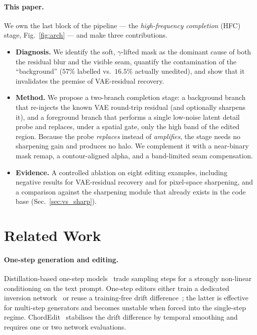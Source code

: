 \documentclass[10pt,twocolumn,letterpaper]{article}
\begin{document}
\paragraph{This paper.}
We own the last block of the pipeline --- the \emph{high-frequency completion}
(HFC) stage, Fig.~\ref{fig:arch} --- and make three contributions.
\begin{itemize}
  \item \textbf{Diagnosis.} We identify the soft, $\gamma$-lifted mask as the
        dominant cause of both the residual blur and the visible seam, quantify
        the contamination of the ``background'' ($57\%$ labelled vs.\ $16.5\%$
        actually unedited), and show that it invalidates the premise of
        VAE-residual recovery.
  \item \textbf{Method.} We propose a two-branch completion stage: a background
        branch that re-injects the known VAE round-trip residual (and optionally
        sharpens it), and a foreground branch that performs a single low-noise
        latent detail probe and replaces, under a spatial gate, only the high
        band of the edited region. Because the probe \emph{replaces} instead of
        \emph{amplifies}, the stage needs no sharpening gain and produces no
        halo. We complement it with a near-binary mask remap, a contour-aligned
        alpha, and a band-limited seam compensation.
  \item \textbf{Evidence.} A controlled ablation on eight editing examples,
        including negative results for VAE-residual recovery and for
        pixel-space sharpening, and a comparison against the sharpening module
        that already exists in the code base (Sec.~\ref{sec:vs_sharp}).
\end{itemize}

\section{Related Work}
\label{sec:related}

\paragraph{One-step generation and editing.}
Distillation-based one-step models~\cite{sdxl_lightning,sd_turbo,swiftbrush2,instaflow}
trade sampling steps for a strongly non-linear conditioning on the text prompt.
One-step editors either train a dedicated inversion network~\cite{swiftedit} or
reuse a training-free drift difference~\cite{flowedit,infedit}; the latter is
effective for multi-step generators and becomes unstable when forced into the
single-step regime. ChordEdit~\cite{chordedit} stabilises the drift difference by
temporal smoothing and requires one or two network evaluations.
\end{document}
